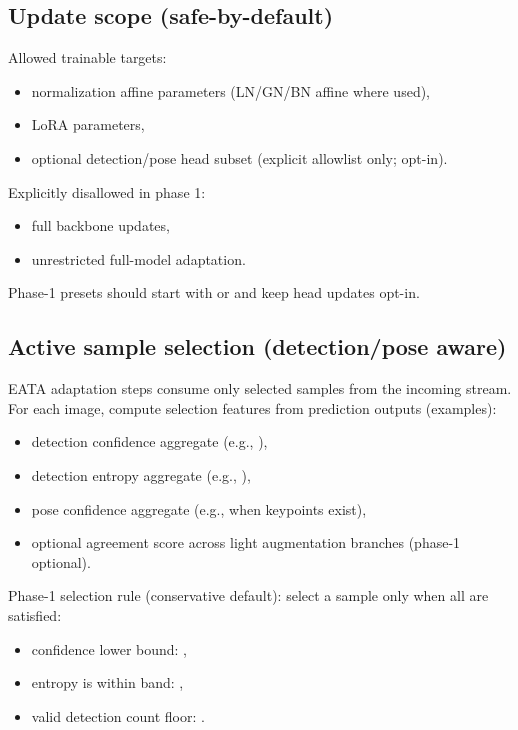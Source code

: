 \subsection{Update scope (safe-by-default)}
Allowed trainable targets:
\begin{itemize}
  \item normalization affine parameters (LN/GN/BN affine where used),
  \item LoRA parameters,
  \item optional detection/pose head subset (explicit allowlist only; opt-in).
\end{itemize}

Explicitly disallowed in phase 1:
\begin{itemize}
  \item full backbone updates,
  \item unrestricted full-model adaptation.
\end{itemize}

Phase-1 presets should start with  or  and keep head updates opt-in.

\subsection{Active sample selection (detection/pose aware)}
EATA adaptation steps consume only selected samples from the incoming stream.
For each image, compute selection features from prediction outputs (examples):
\begin{itemize}
  \item detection confidence aggregate (e.g., ),
  \item detection entropy aggregate (e.g., ),
  \item pose confidence aggregate (e.g.,  when keypoints exist),
  \item optional agreement score across light augmentation branches (phase-1 optional).
\end{itemize}

Phase-1 selection rule (conservative default): select a sample only when all are satisfied:
\begin{itemize}
  \item confidence lower bound: ,
  \item entropy is within band: ,
  \item valid detection count floor: .
\end{itemize}

